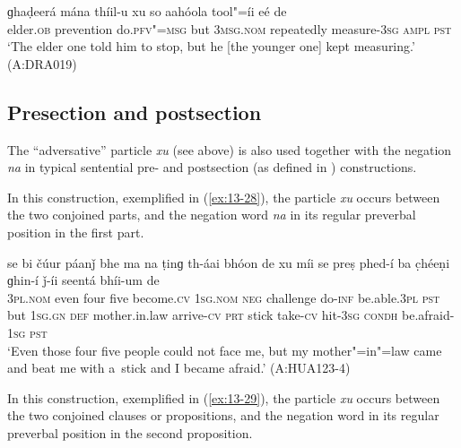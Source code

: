 \begin{exe}
\ex
\label{ex:13-27}
\gll ɡhaḍeerá mána thíil-u xu so aahóola tool"=íi eé de \\
elder.\textsc{ob} prevention do.\textsc{pfv"=msg} but \textsc{3msg.nom} repeatedly measure-\textsc{3sg} \textsc{ampl}{\protect\footnotemark} \textsc{pst} \\
\glt `The elder one told him to stop, but he [the younger one] kept measuring.' (A:DRA019)
\end{exe}


\subsection{Presection and postsection}
\label{subsec:13-2-2}

The ``adversative'' particle \textit{xu} (see above) is also used together with the negation \textit{na} in typical sentential pre- and postsection (as defined in ) constructions.


 In this construction, exemplified in (\ref{ex:13-28}), the particle \textit{xu} occurs between the two conjoined parts, and the negation word \textit{na} in its regular preverbal position in the first part.

\begin{exe}
\ex
\label{ex:13-28}
\gll se bi čúur páanǰ bhe ma na ṭinɡ th-áai bhóon de xu míi se preṣ phed-í ba c̣héeṇi ɡhin-í ǰ-íi seentá bhíi-um de \\
\textsc{3pl.nom} even four five become.\textsc{cv} \textsc{1sg.nom} \textsc{neg}  challenge do-\textsc{inf} be.able.\textsc{3pl} \textsc{pst} but \textsc{1sg.gn}  \textsc{def} mother.in.law arrive-\textsc{cv} \textsc{prt} stick take-\textsc{cv} hit-\textsc{3sg} \textsc{condh} be.afraid-\textsc{1sg} \textsc{pst} \\
\glt `Even those four five people could not face me, but my mother"=in"=law came and beat me with a~stick and I became afraid.' (A:HUA123-4) 
\end{exe}

 In this construction, exemplified in (\ref{ex:13-29}), the particle \textit{xu} occurs between the two conjoined clauses or propositions, and the negation word in its regular preverbal position in the second proposition.

